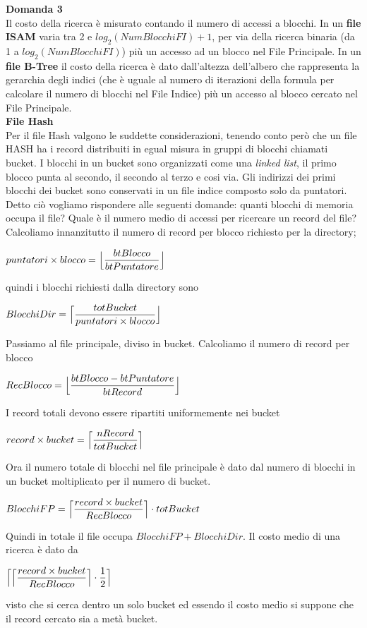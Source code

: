   \noindent\textbf{\fontsize{14pt}{1em}Domanda 3}\\
  Il costo della ricerca è misurato contando il numero di accessi a blocchi. In un \textbf{file ISAM} varia tra 2 e 
  $log_2(NumBlocchiFI) + 1$, per via della ricerca binaria (da 1 a $log_2(NumBlocchiFI)$) più un accesso ad un blocco
  nel File Principale. In un \textbf{file B-Tree} il costo della ricerca è dato dall'altezza dell'albero che rappresenta
  la gerarchia degli indici (che è uguale al numero di iterazioni della formula per calcolare il 
  numero di blocchi nel File Indice) più un accesso al blocco cercato nel File Principale.\\
  
  \noindent\textbf{\fontsize{16pt}{1em}File Hash}\\
  Per il file Hash valgono le suddette considerazioni, tenendo conto però che un file HASH ha i record distribuiti in egual misura
  in gruppi di blocchi chiamati bucket. I blocchi in un bucket sono organizzati come una \emph{linked list}, il primo blocco punta al
  secondo, il secondo al terzo e cosi via. Gli indirizzi dei primi blocchi dei bucket sono conservati in un file indice composto solo
  da puntatori. Detto ciò vogliamo rispondere alle seguenti domande: quanti blocchi di
  memoria occupa il file? Quale è il numero medio di accessi per ricercare un record del file?\\
  
Calcoliamo innanzitutto il numero di record per blocco richiesto per la directory; 
\begin{center}
 $puntatori \times blocco = \Bigl\lfloor \dfrac{btBlocco}{btPuntatore} \Bigr\rfloor$
\end{center}
quindi i blocchi richiesti dalla directory sono
\begin{center}
 $BlocchiDir = \Bigl\lceil \dfrac{totBucket}{puntatori \times blocco} \Bigr\rfloor$
\end{center}
Passiamo al file principale, diviso in bucket. Calcoliamo il numero di record per blocco
\begin{center}
 $RecBlocco = \Bigl\lfloor \dfrac{btBlocco-btPuntatore}{btRecord} \Bigr\rfloor$
\end{center}
I record totali devono essere ripartiti uniformemente nei bucket
\begin{center}
 $record \times bucket = \Bigl\lceil \dfrac{nRecord}{totBucket} \Bigr\rceil$
\end{center}
Ora il numero totale di blocchi nel file principale è dato dal numero di blocchi in un bucket
moltiplicato per il numero di bucket.
\begin{center}
 $BlocchiFP = \Bigl\lceil \dfrac{record \times bucket}{RecBlocco} \Bigr\rceil \cdot totBucket$
\end{center}
Quindi in totale il file occupa $BlocchiFP + BlocchiDir$. Il costo medio di 
una ricerca è dato da
\begin{center}
 $\Bigl\lceil \Bigl\lceil \dfrac{record \times bucket}{RecBlocco} \Bigr\rceil \cdot \dfrac{1}{2} \Bigr\rceil$
\end{center}
visto che si cerca dentro un solo bucket ed essendo il costo medio si suppone che il record
cercato sia a metà bucket.

